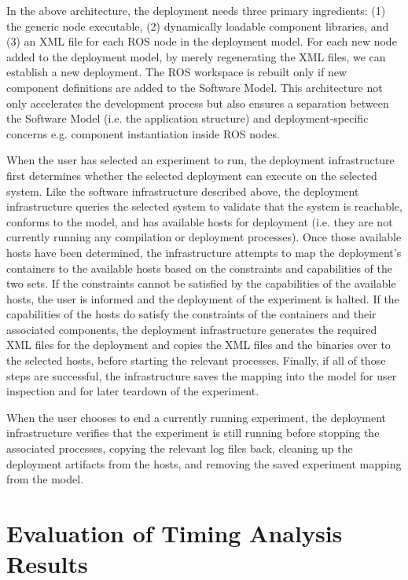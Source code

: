 In the above architecture, the deployment needs three primary
ingredients: (1) the generic node executable, (2) dynamically loadable
component libraries, and (3) an XML file for each ROS node in the
deployment model. For each new node added to the deployment model, by
merely regenerating the XML files, we can establish a new
deployment. The ROS workspace is rebuilt only if new component
definitions are added to the Software Model. This architecture not
only accelerates the development process but also ensures a separation
between the Software Model (i.e. the application structure) and
deployment-specific concerns e.g. component instantiation inside ROS
nodes.

When the user has selected an experiment to run, the deployment
infrastructure first determines whether the selected deployment can
execute on the selected system.  Like the software infrastructure
described above, the deployment infrastructure queries the selected
system to validate that the system is reachable, conforms to the
model, and has available hosts for deployment (i.e. they are not
currently running any compilation or deployment processes).  Once
those available hosts have been determined, the infrastructure
attempts to map the deployment's containers to the available hosts
based on the constraints and capabilities of the two sets.  If the
constraints cannot be satisfied by the capabilities of the available
hosts, the user is informed and the deployment of the experiment is
halted.  If the capabilities of the hosts do satisfy the constraints
of the containers and their associated components, the deployment
infrastructure generates the required XML files for the deployment and
copies the XML files and the binaries over to the selected hosts,
before starting the relevant processes.  Finally, if all of those
steps are successful, the infrastructure saves the mapping into the
model for user inspection and for later teardown of the experiment.

When the user chooses to end a currently running experiment, the
deployment infrastructure verifies that the experiment is still
running before stopping the associated processes, copying the relevant
log files back, cleaning up the deployment artifacts from the hosts,
and removing the saved experiment mapping from the model.

\section{Evaluation of Timing Analysis Results}

